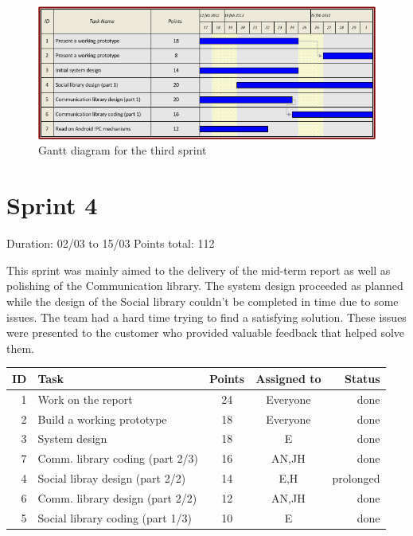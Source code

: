 \begin{figure}[h!]
\centering \includegraphics[scale=0.8]{img/sprints-gantt3.png}
\caption{Gantt diagram for the third sprint}
\label{fig:sprints-gantt3}
\end{figure}

\newpage

\section{Sprint 4}

Duration: 02/03 to 15/03\newline
Points total: 112

This sprint was mainly aimed to the delivery of the mid-term report as well
as polishing of the Communication library. The system design proceeded as
planned while the design of the Social library couldn't be completed in time
due to some issues. The team had a hard time trying to find a satisfying
solution. These issues were presented to the customer who provided valuable
feedback that helped solve them.

\begin{table}[ht!]
\begin{tabular}{ | r | l | c | c | r | }

\hline
\textbf{ID} & \textbf{Task} & \textbf{Points} & \textbf{Assigned to} & \textbf{Status} \\
\hline

 1 & Work on the report					& 24 & Everyone & done \\
\hline
 2 & Build a working prototype			& 18 & Everyone & done \\
\hline
 3 & System design						& 18 & E 		& done \\
\hline
 7 & Comm. library coding (part 2/3)	& 16 & AN,JH	& done \\
\hline
 4 & Social libray design (part 2/2)	& 14 & E,H		& prolonged \\
\hline
 6 & Comm. library design (part 2/2)	& 12 & AN,JH	& done \\
\hline
 5 & Social library coding (part 1/3)	& 10 & E 		& done \\
\hline

\end{tabular}
\end{table}

